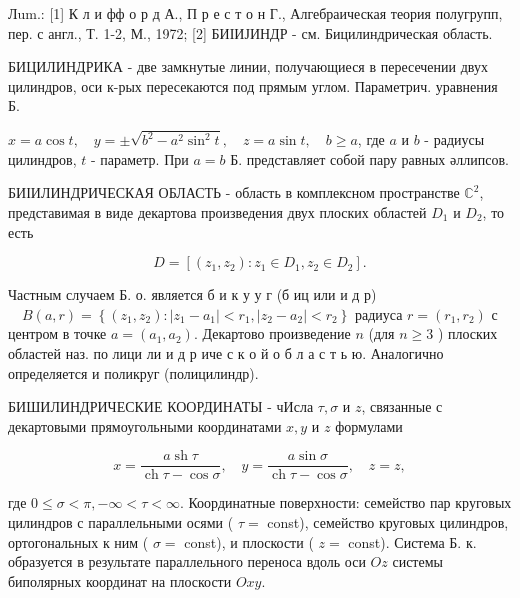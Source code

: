 \documentclass[10pt]{article}
\begin{document}
Лum.: [1] К л и фф о р д А., П р е с т о н Г., Алгебраическая теория полугрупп, пер. с англ., Т. 1-2, М., 1972; [2] БИІИЈИНДР - см. Бицилиндрическая область.



БИЦИЛИНДРИКА - две замкнутые линии, получающиеся в пересечении двух цилиндров, оси к-рых пересекаются под прямым углом. Параметрич. уравнения Б.



$x=a \cos t, \quad y= \pm \sqrt{b^{2}-a^{2} \sin ^{2} t}, \quad z=a \sin t, \quad b \geqslant a$, где $a$ и $b$ - радиусы цилиндров, $t$ - параметр. При $a=b$ Б. представляет собой пару равных әллипсов.



БИІИЛИНДРИЧЕСКАЯ ОБЛАСТЬ - область в комплексном пространстве $\mathbb{C}^{2}$, представимая в виде декартова произведения двух плоских областей $D_{1}$ и $D_{2}$, то есть



\[

D=\left[\left(z_{1}, z_{2}\right): z_{1} \in D_{1}, z_{2} \in D_{2}\right] .

\]



Частным случаем Б. о. является б и к у у г (б иц или и д р) $\quad B(a, r)=\left\{\left(z_{1}, z_{2}\right):\left|z_{1}-a_{1}\right|<r_{1},\left|z_{2}-a_{2}\right|<r_{2}\right\}$ радиуса $r=\left(r_{1}, r_{2}\right)$ с центром в точке $a=\left(a_{1}, a_{2}\right)$. Декартово произведение $n$ (для $n \geqslant 3$ ) плоских областей наз. по лици ли и д р иче с к о й $о$ б л а с т ь ю. Аналогично определяется и поликруг (полицилиндр).



БИШИЛИНДРИЧЕСКИЕ КООРДИНАТЫ - чИсла $\tau, \sigma$ и $z$, связанные с декартовыми прямоугольными координатами $x, y$ и $z$ формулами



\[

x=\frac{a \operatorname{sh} \tau}{\operatorname{ch} \tau-\cos \sigma}, \quad y=\frac{a \sin \sigma}{\operatorname{ch} \tau-\cos \sigma}, \quad z=z,

\]



где $0 \leqslant \sigma<\pi,-\infty<\tau<\infty$. Координатные поверхности: семейство пар круговых цилиндров с параллельными осями ( $\tau=$ const), семейство круговых цилиндров, ортогональных к ним ( $\sigma=$ const), и плоскости ( $z=$ const). Система Б. к. образуется в результате параллельного переноса вдоль оси $O z$ системы биполярных координат на плоскости $O x y$.
\end{document}
